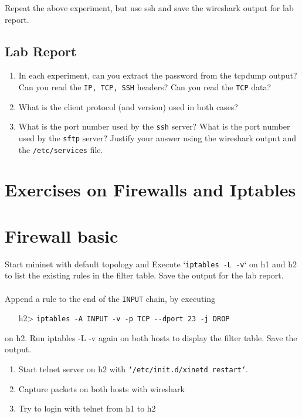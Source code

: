 \documentclass[10pt,a4paper]{article}
\numberwithin{equation}{section}
\numberwithin{figure}{section}
\numberwithin{table}{section}
\begin{document}
	Repeat the above experiment, but use ssh and save the wireshark output for lab report.
	
	\subsection*{Lab Report}
	\begin{enumerate}
		\setlength{\itemindent}{0pt}
		\item In each experiment, can you extract the password from the tcpdump output? Can you read the \texttt{IP, TCP, SSH} headers? Can you read the \texttt{TCP} data?
		\item What is the client protocol (and version) used in both cases?
		\item What is the port number used by the \texttt{ssh} server? What is the port number used by the \texttt{sftp} server? Justify your answer using the wireshark output and the \texttt{/etc/services} file.
	\end{enumerate}
	
	
	\section*{Exercises on Firewalls and Iptables}
	\section{Firewall basic}
	Start mininet with default topology and Execute `\texttt{iptables -L -v}` on h1 and h2 to list the existing rules in the filter table. Save the output for the lab report.\\
	\\
	Append a rule to the end of the \texttt{INPUT} chain, by executing
	
	\begin{itemize}
		\setlength{\itemindent}{10pt}
		\item [h2>] \texttt{iptables -A INPUT -v -p TCP {-}{-}dport 23 -j DROP} 
	\end{itemize}
	
	\setlength{\parindent}{0pt}
	on h2. Run iptables -L -v again on both hosts to display the filter table. Save the output.\\
	
	
	\begin{enumerate}
		\setlength{\itemindent}{0pt}
		\item Start telnet server on h2 with \texttt{`/etc/init.d/xinetd restart`}.
		\item Capture packets on both hosts with wireshark
		\item Try to login with telnet from h1 to h2
	\end{enumerate}
	
\end{document}
